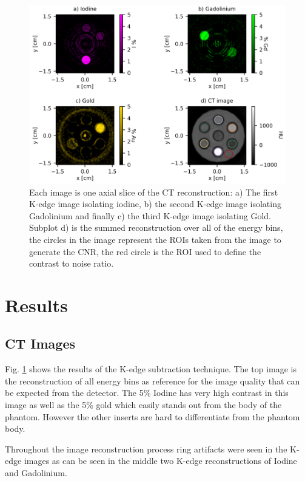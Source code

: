 \documentclass[journal, a4paper]{IEEEtran}
\begin{document}
\begin{figure}[htbp]

\includegraphics[width=\linewidth]{Figures/individual_kedge.png}

\caption{Each image is one axial slice of the CT reconstruction: a) The first K-edge image isolating iodine, b) the second K-edge image isolating Gadolinium and finally c) the third K-edge image isolating Gold. Subplot d) is the summed reconstruction over all of the energy bins, the circles in the image represent the ROIs taken from the image to generate the CNR, the red circle is the ROI used to define the contrast to noise ratio.}
\label{colour_plots}

\end{figure}


\section{Results}

\subsection{CT Images}

Fig. \ref{colour_plots} shows the results of the K-edge subtraction technique. The top image is the reconstruction of all energy bins as reference for the image quality that can be expected from the detector. The 5\% Iodine has very high contrast in this image as well as the 5\% gold which easily stands out from the body of the phantom. However the other inserts are hard to differentiate from the phantom body. 

Throughout the image reconstruction process ring artifacts were seen in the K-edge images as can be seen in the middle two K-edge reconstructions of Iodine and Gadolinium.
\end{document}
